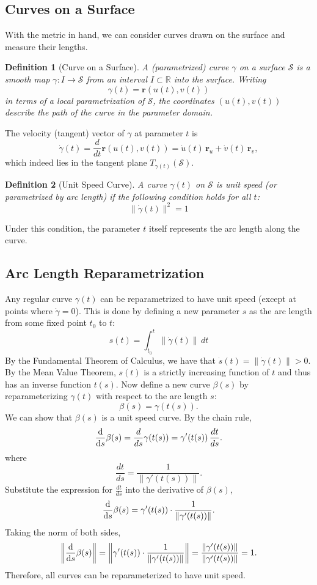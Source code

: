 \documentclass[12pt]{article}
\newtheorem{definition}{Definition}[section]
\begin{document}
\subsection{Curves on a Surface}
With the metric in hand, we can consider curves drawn on the surface and measure their lengths. 

\begin{definition}[Curve on a Surface]\label{def:curve}
A (parametrized) curve $\gamma$ on a surface $\mathcal{S}$ is a smooth map $\gamma: I \to \mathcal{S}$ from an interval $I\subset \mathbb{R}$ into the surface. 
Writing 
\begin{equation}\label{eq:curve-param}
	\gamma(t) = \mathbf{r}(u(t), v(t))
\end{equation}
in terms of a local parametrization of $\mathcal{S}$, the coordinates $(u(t), v(t))$ describe the path of the curve in the parameter domain. 
\end{definition}
The velocity (tangent) vector of $\gamma$ at parameter $t$ is 
\begin{equation}\label{eq:curve-vel}
	\dot\gamma(t) = \frac{d}{dt}\mathbf{r}(u(t), v(t)) = \dot{u}(t)\,\mathbf{r}_u + \dot{v}(t)\,\mathbf{r}_v,
\end{equation}
which indeed lies in the tangent plane $T_{\gamma(t)}(\mathcal{S})$. 


\begin{definition}[Unit Speed Curve]\label{def:unit-speed}
A curve $\gamma(t)$ on $\mathcal{S}$ is \emph{unit speed} (or parametrized by arc length) if the following condition holds for all $t$:
\[
\|\dot{\gamma}(t)\|^{2} = 1
\] 
\end{definition}

Under this condition, the parameter $t$ itself represents the arc length along the curve. 


\subsection{Arc Length Reparametrization}
Any regular curve $\gamma(t)$ can be reparametrized to have unit speed (except at points where $\dot\gamma=0$). 
This is done by defining a new parameter $s$ as the arc length from some fixed point $t_0$ to $t$:
\[
s(t) = \int_{t_0}^{t} \|\dot\gamma(t)\|\,dt 
\]
By the Fundamental Theorem of Calculus, we have that $\dot{s}(t) = \|\dot\gamma(t)\| > 0$.
By the Mean Value Theorem, $s(t)$ is a strictly increasing function of $t$ and thus has an inverse function $t(s)$.
Now define a new curve \(\beta(s)\) by reparameterizing \(\gamma(t)\) with respect to the arc length \(s\):
\[
\beta(s)=\gamma(t(s)).
\]
We can show that \(\beta(s)\) is a unit speed curve.
By the chain rule,
\[
\dv{s}\beta(s) = \frac{d}{ds}\gamma(t(s)) = \gamma'(t(s))\,\frac{dt}{ds}.
\]
where 
\[
\frac{dt}{ds} = \frac{1}{\|\gamma'(t(s))\|}.
\]
Substitute the expression for \(\frac{dt}{ds}\) into the derivative of \(\beta(s)\),
\[
\dv{s}\beta(s) = \gamma'(t(s))\cdot \frac{1}{\|\gamma'(t(s))\|}.
\]
Taking the norm of both sides,
\[
\left\|\dv{s}\beta(s)\right\| = \left\|\gamma'(t(s)) \cdot \frac{1}{\|\gamma'(t(s))\|}\right\| = \frac{\|\gamma'(t(s))\|}{\|\gamma'(t(s))\|} = 1.
\]
Therefore, all curves can be reparameterized to have unit speed.
\end{document}
